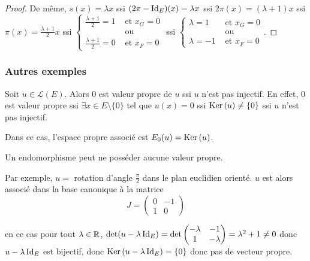 \begin{exemple}
\begin{proof}
        \avspace De même, $s(x) = \lambda x$ ssi $(2 \pi - \operatorname{Id}_E)(x) = \lambda x$ ssi
        $2 \pi(x) = (\lambda + 1) x$ ssi $\pi(x) = \frac{\lambda + 1}{2} x$ 
        ssi $\begin{cases}
            \frac{\lambda + 1}{2} = 1 &\text{ et } x_G = 0 \\
            & \text{ ou } \\
            \frac{\lambda + 1}{2} = 0 &\text{ et } x_F = 0
        \end{cases}$ ssi $\begin{cases}
            \lambda = 1 &\text{ et } x_G = 0 \\
            & \text{ ou } \\
            \lambda = -1 &\text{ et } x_F = 0
        \end{cases}$.
    \end{proof}
\end{exemple}

\subsubsection{Autres exemples }


\avspace

\begin{exemple}
    Soit $u \in \mathscr L(E)$. Alors $0$ est valeur propre de $u$ ssi $u$ n'est pas injectif.
    En effet, $0$ est valeur propre ssi $\exists x \in E \setminus \{0\}$ tel que $u(x) = 0$ 
    ssi $\operatorname{Ker} \,(u) \neq \{0\}$ ssi $u$ n'est pas injectif.

    Dans ce cas, l'espace propre associé est $E_0(u) = \operatorname{Ker} \,(u)$.
\end{exemple}

Un endomorphisme peut ne posséder aucune valeur propre.

\begin{exemple}
    Par exemple, $u = $ rotation d'angle $\frac \pi 2$ dans le plan euclidien orienté. 
    $u$ est alors associé dans la base canonique à la matrice
    \[
        J = \begin{pmatrix}
            0 & -1 \\
            1 & 0
        \end{pmatrix}
    \]

    en ce cas pour tout $\lambda \in \mathbb{R}$, $\det(u - \lambda \operatorname{Id}_E) = \det \begin{pmatrix}
        -\lambda & -1 \\
        1 & -\lambda
    \end{pmatrix} = \lambda^2 + 1 \neq 0$ donc $u - \lambda \operatorname{Id}_E$ est bijectif, donc 
    $\operatorname{Ker} \,(u - \lambda \operatorname{Id}_E) = \{0\}$ donc pas de vecteur propre. 
\end{exemple}

